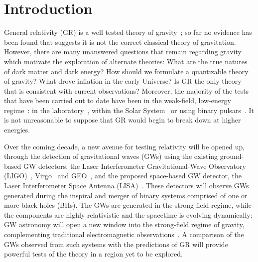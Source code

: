 \documentclass[aps,prd,amsfonts,amssymb,amsmath,nofootinbib,reprint,showpacs]{revtex4-1}
\begin{document}
\section{Introduction}

General relativity (GR) is a well tested theory of gravity~\cite{Will2006}; so far no evidence has been found that suggests it is not the correct classical theory of gravitation. However, there are many unanswered questions that remain regarding gravity which motivate the exploration of alternate theories: What are the true natures of dark matter and dark energy? How should we formulate a quantizable theory of gravity? What drove inflation in the early Universe?  Is GR the only theory that is consistent with current observations? Moreover, the majority of the tests that have been carried out to date have been in the weak-field, low-energy regime~\cite{Will2006, Will1993}: in the laboratory~\cite{Adelberger2009, Adelberger2003}, within the Solar System~\cite{Bertotti2003, Everitt2009} or using binary pulsars~\cite{Stairs2003}. It is not unreasonable to suppose that GR would begin to break down at higher energies.

Over the coming decade, a new avenue for testing relativity will be opened up, through the detection of gravitational waves (GWs) using the existing ground-based GW detectors, the Laser Interferometer Gravitational-Wave Observatory (LIGO)~\cite{Abramovici1992, Abbott2009}, Virgo~\cite{Accadia2010} and GEO~\cite{Willke2002, Abadie2010}, and the proposed space-based GW detector, the Laser Interferometer Space Antenna (LISA)~\cite{Bender1998, Danzmann2003}. These detectors will observe GWs generated during the inspiral and merger of binary systems comprised of one or more black holes (BHs). The GWs are generated in the strong-field regime, while the components are highly relativistic and the spacetime is evolving dynamically: GW astronomy will open a new window into the strong-field regime of gravity, complementing traditional electromagnetic observations~\cite{Psaltis2008a}.  A comparison of the GWs observed from such systems with the predictions of GR will provide powerful tests of the theory in a region yet to be explored.
\end{document}
